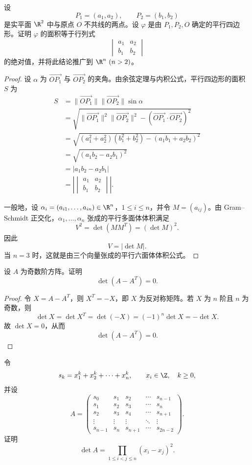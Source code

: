 \begin{problem}
设
	\[
	P_1=(a_1,a_2),\qquad P_2=(b_1,b_2)
	\]
	是实平面 $\R^2$ 中与原点 $O$ 不共线的两点。设 $\varphi$ 是由 $P_1,P_2,O$ 确定的平行四边形。证明 $\varphi$ 的面积等于行列式
	\[
	\begin{vmatrix}
		a_1&a_2\\
		b_1&b_2
	\end{vmatrix}
	\]
	的绝对值，并将此结论推广到 $\R^n\ (n>2)$。
\end{problem}

\begin{proof}
	设 $\alpha$ 为 $\overrightarrow{OP_1}$ 与 $\overrightarrow{OP_2}$ 的夹角。由余弦定理与内积公式，平行四边形的面积 $S$ 为
	\[
	\begin{aligned}
		S
		&=\lVert\overrightarrow{OP_1}\rVert
		\lVert\overrightarrow{OP_2}\rVert\sin\alpha\\
		&=\sqrt{
			\lVert\overrightarrow{OP_1}\rVert^2
			\lVert\overrightarrow{OP_2}\rVert^2
			-(\overrightarrow{OP_1}\cdot\overrightarrow{OP_2})^2}\\
		&=\sqrt{(a_1^2+a_2^2)(b_1^2+b_2^2)
			-(a_1b_1+a_2b_2)^2}\\
		&=\sqrt{(a_1b_2-a_2b_1)^2}\\
		&=|a_1b_2-a_2b_1|\\
		&=\left|
		\begin{vmatrix}
			a_1&a_2\\
			b_1&b_2
		\end{vmatrix}
		\right|.
	\end{aligned}
	\]
	
	一般地，设 $\alpha_i=(a_{i1},\ldots,a_{in})\in\R^n$，$1\leq i\leq n$，并令 $M=(a_{ij})$。由 Gram--Schmidt 正交化，$\alpha_1,\ldots,\alpha_n$ 张成的平行多面体体积满足
	\[
	V^2=\det(MM^T)=(\det M)^2.
	\]
	因此
	\[
	V=|\det M|.
	\]
	当 $n=3$ 时，这就是由三个向量张成的平行六面体体积公式。
\end{proof}

\begin{problem}
设 $A$ 为奇数阶方阵。证明
	\[
	\det(A-A^T)=0.
	\]
\end{problem}

\begin{proof}
	令 $X=A-A^T$，则 $X^T=-X$，即 $X$ 为反对称矩阵。若 $X$ 为 $n$ 阶且 $n$ 为奇数，则
	\[
	\det X=\det X^T=\det(-X)=(-1)^n\det X=-\det X.
	\]
	故 $\det X=0$，从而
	\[
	\det(A-A^T)=0.
	\]
\end{proof}

\begin{problem}
令
	\[
	s_k=x_1^k+x_2^k+\cdots+x_n^k,
	\qquad x_i\in\Z,\quad k\geq0,
	\]
	并设
	\[
	A=\begin{pmatrix}
		s_0&s_1&s_2&\cdots&s_{n-1}\\
		s_1&s_2&s_3&\cdots&s_n\\
		s_2&s_3&s_4&\cdots&s_{n+1}\\
		\vdots&\vdots&\vdots&\ddots&\vdots\\
		s_{n-1}&s_n&s_{n+1}&\cdots&s_{2n-2}
	\end{pmatrix}.
	\]
	证明
	\[
	\det A=\prod_{1\leq i<j\leq n}(x_i-x_j)^2.
	\]
\end{problem}

